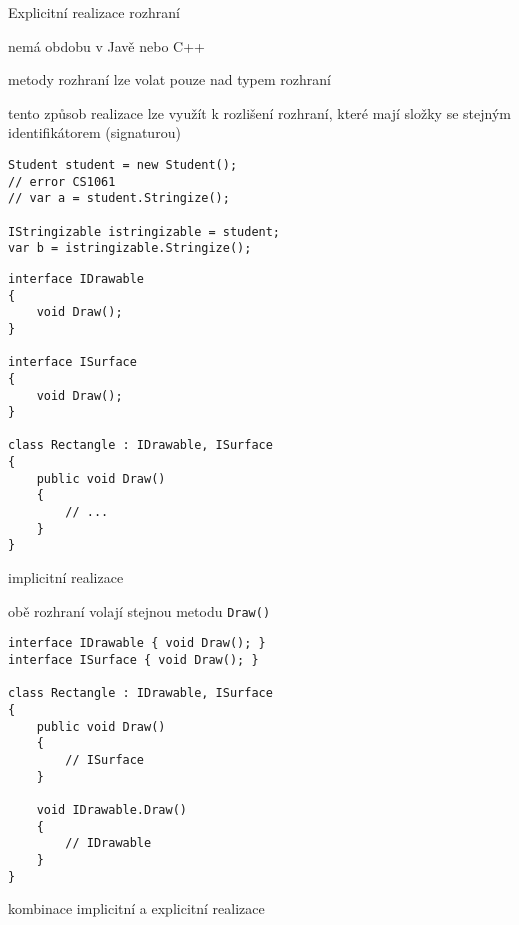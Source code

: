 \begin{frame}[fragile]
\vfill
\begin{bitemize}{Explicitní realizace rozhraní}
\item nemá obdobu v Javě nebo C++
\item metody rozhraní lze volat pouze nad typem rozhraní
\item tento způsob realizace lze využít k rozlišení rozhraní, které mají složky se stejným identifikátorem (signaturou)
\end{bitemize}
\vfill
\begin{yesblock}
\begin{lstlisting}[basicstyle=\small]
Student student = new Student();
// error CS1061
// var a = student.Stringize();

IStringizable istringizable = student;
var b = istringizable.Stringize();
\end{lstlisting}
\end{yesblock}
\vfill
\end{frame}







\begin{frame}[fragile]
\begin{yesblock}
\begin{lstlisting}[basicstyle=\small]
interface IDrawable
{
    void Draw();
}

interface ISurface
{
    void Draw();
}

class Rectangle : IDrawable, ISurface
{
    public void Draw()
    {
        // ...
    }
}
\end{lstlisting}
\end{yesblock}
\vfill
\begin{bitemize}{}
\item implicitní realizace
\item obě rozhraní volají stejnou metodu \lstinline|Draw()|
\end{bitemize}
\end{frame}


\begin{frame}[fragile]
\begin{yesblock}
\begin{lstlisting}
interface IDrawable { void Draw(); }
interface ISurface { void Draw(); }

class Rectangle : IDrawable, ISurface
{
    public void Draw()
    {
        // ISurface
    }

    void IDrawable.Draw()
    {
        // IDrawable
    }
}
\end{lstlisting}
\end{yesblock}
\vfill
\begin{bitemize}{}
\item kombinace implicitní a explicitní realizace
\end{bitemize}
\end{frame}




